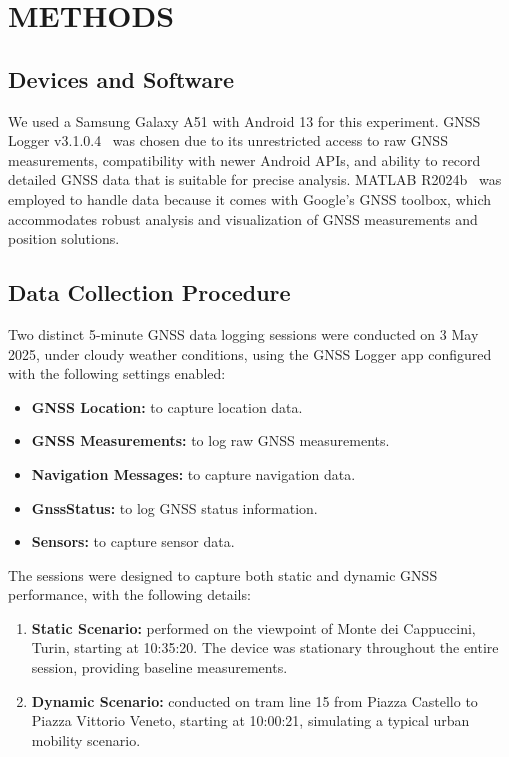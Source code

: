 
\section{METHODS} \label{sec:methods}

    \subsection{Devices and Software}
    
        We used a Samsung Galaxy A51 with Android 13 for this experiment.
        GNSS Logger v3.1.0.4~\cite{GNSSLogger} was chosen due to its unrestricted access to raw GNSS measurements, compatibility with newer Android APIs, and ability to record detailed GNSS data that is suitable for precise analysis.
        MATLAB R2024b~\cite{MATLAB2024b} was employed to handle data because it comes with Google's GNSS toolbox, which accommodates robust analysis and visualization of GNSS measurements and position solutions.
        
    \subsection{Data Collection Procedure}
    
        Two distinct 5-minute GNSS data logging sessions were conducted on 3 May 2025, under cloudy weather conditions, using the GNSS Logger app configured with the following settings enabled:

        \begin{itemize}
            \item \textbf{GNSS Location:} to capture location data.
            \item \textbf{GNSS Measurements:} to log raw GNSS measurements.
            \item \textbf{Navigation Messages:} to capture navigation data.
            \item \textbf{GnssStatus:} to log GNSS status information.
            \item \textbf{Sensors:} to capture sensor data.
        \end{itemize}
        
        \noindent The sessions were designed to capture both static and dynamic GNSS performance, with the following details:

        \begin{enumerate}[label=\alph*)]
            \item \textbf{Static Scenario:} performed on the viewpoint of Monte dei Cappuccini, Turin, starting at 10:35:20. The device was stationary throughout the entire session, providing baseline measurements.
            \item \textbf{Dynamic Scenario:} conducted on tram line 15 from Piazza Castello to Piazza Vittorio Veneto, starting at 10:00:21, simulating a typical urban mobility scenario.
        \end{enumerate}

